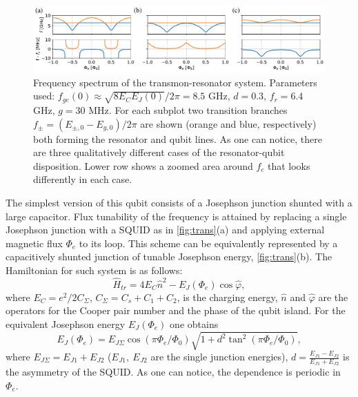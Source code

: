 \documentclass[%
 aip,
 amsmath,amssymb,
 reprint,%
]{revtex4-1}
\begin{document}
\begin{figure}
	\centering
	\includegraphics[width=\textwidth]{anti_theor}
	\caption{Frequency spectrum of the transmon-resonator system. Parameters used: $f_{ge}(0) \approx \sqrt{8E_C E_J(0)}/2\pi = 8.5$ GHz, $d=0.3$, $f_r=6.4$ GHz, $g = 30$ MHz. For each subplot two transition branches  $f_{\pm} = (E_{\pm,0} - E_{g,0})/2\pi$ are shown (orange and blue, respectively) both forming the resonator and qubit lines. As one can notice, there are three qualitatively different cases of the resonator-qubit disposition. Lower row shows a zoomed area around $f_c$ that looks differently in each case.}
	\label{fig:anti_theor}
\end{figure}

The simplest version of this qubit consists of a Josephson junction shunted with a large capacitor. Flux tunability of the frequency is attained by replacing a single Josephson junction with a SQUID as in \autoref{fig:trans}(a) and applying external magnetic flux $\Phi_e$ to its loop. This scheme can be equivalently represented by a capacitively shunted junction of tunable Josephson energy, \autoref{fig:trans}(b). The Hamiltonian for such system is as follows: 
\begin{equation}
\hat{H}_{tr} = 4E_C \hat n^2 - E_J(\Phi_e) \cos \hat\varphi,
\label{eq:tr_ham}
\end{equation}
where $E_C = e^2/2C_{\Sigma}$, $C_{\Sigma} = C_s + C_1 +C_2$, is the charging energy, $\hat n$ and $\hat \varphi$ are the operators for the Cooper pair number and the phase of the qubit island. For the equivalent Josephson energy $E_{J}(\Phi_e)$ one obtains
\begin{equation}
E_{J}(\Phi_e) = E_{J\Sigma}\cos\left(\pi \Phi_e/\Phi_0\right) \sqrt{1+d^2 \tan^2 \left(\pi \Phi_e/\Phi_0\right)},
\label{eq:EJ_Phie}
\end{equation}  
where $E_{J\Sigma} = E_{J1}+E_{J2}$ ($E_{J1},\ E_{J2}$ are the single junction energies), $d = \frac{E_{J1}-E_{J2}}{E_{J1}+E_{J2}}$ is the asymmetry of the SQUID. As one can notice, the dependence is periodic in $\Phi_e$.
\end{document}
